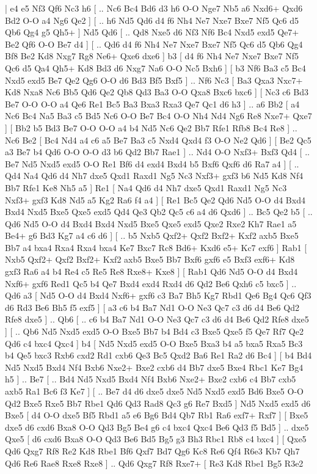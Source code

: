 \makegametitle 
|   e4   e5    Nf3   Qf6    Nc3   h6 [ .. Nc6  Bc4 Bd6  d3 h6  O-O Nge7  Nb5 a6  Nxd6+ Qxd6  Bd2 O-O  a4 Ng6  Qe2   ]  [ .. h6  Nd5 Qd6  d4 f6  Nh4 Ne7  Nxe7 Bxe7  Nf5 Qc6  d5 Qb6  Qg4 g5  Qh5+   ]  Nd5   Qd6 [ .. Qd8  Nxe5 d6  Nf3 Nf6  Bc4 Nxd5  exd5 Qe7+  Be2 Qf6  O-O Be7  d4   ]  [ .. Qd6  d4 f6  Nh4 Ne7  Nxe7 Bxe7  Nf5 Qc6  d5 Qb6  Qg4 Bf8  Be2 Kd8  Nxg7 Rg8  Ne6+ Qxe6  dxe6   ]  b3 [  d4 f6  Nh4 Ne7  Nxe7 Bxe7  Nf5 Qc6  d5 Qa4  Qh5+ Kd8  Bd3 d6  Nxg7 Na6  O-O Nc5  Bxh6   ]  [  b3 Nf6  Ba3 c5  Bc4 Nxd5  exd5 Be7  Qe2 Qg6  O-O d6  Bd3 Bf5  Bxf5   ] .. Nf6    Nc3 [  Ba3 Qxa3  Nxc7+ Kd8  Nxa8 Nc6  Bb5 Qd6  Qe2 Qb8  Qd3 Ba3  O-O Qxa8  Bxc6 bxc6   ]  [  Nc3 c6  Bd3 Be7  O-O O-O  a4 Qe6  Re1 Bc5  Ba3 Bxa3  Rxa3 Qe7  Qc1 d6  h3   ] .. a6    Bb2 [  a4 Nc6  Bc4 Na5  Ba3 c5  Bd5 Nc6  O-O Be7  Bc4 O-O  Nh4 Nd4  Ng6 Re8  Nxe7+ Qxe7   ]  [  Bb2 b5  Bd3 Be7  O-O O-O  a4 b4  Nd5 Nc6  Qe2 Bb7  Rfe1 Rfb8  Bc4 Re8   ] .. Nc6    Be2 [  Bc4 Nd4  a4 c6  a5 Be7  Ba3 c5  Nxd4 Qxd4  f3 O-O  Ne2 Qd6   ]  [  Be2 Qc5  a3 Be7  b4 Qd6  O-O O-O  d3 b6  Qd2 Bb7  Rae1   ] .. Nd4    O-O   Nxf3+    Bxf3   Qd4 [ .. Be7  Nd5 Nxd5  exd5 O-O  Re1 Bf6  d4 exd4  Bxd4 b5  Bxf6 Qxf6  d6 Ra7  a4   ]  [ .. Qd4  Na4 Qd6  d4 Nh7  dxe5 Qxd1  Raxd1 Ng5  Nc3 Nxf3+  gxf3 b6  Nd5 Kd8  Nf4 Bb7  Rfe1 Ke8  Nh5 a5   ]  Re1 [  Na4 Qd6  d4 Nh7  dxe5 Qxd1  Raxd1 Ng5  Nc3 Nxf3+  gxf3 Kd8  Nd5 a5  Kg2 Ra6  f4 a4   ]  [  Re1 Bc5  Qe2 Qd6  Nd5 O-O  d4 Bxd4  Bxd4 Nxd5  Bxe5 Qxe5  exd5 Qd4  Qe3 Qb2  Qc5 c6  a4 d6  Qxd6   ] .. Bc5    Qe2   b5 [ .. Qd6  Nd5 O-O  d4 Bxd4  Bxd4 Nxd5  Bxe5 Qxe5  exd5 Qxe2  Rxe2 Kh7  Rae1 a5  Be4+ g6  Bd3 Kg7  a4 c6  d6   ]  [ .. b5  Nxb5 Qxf2+  Qxf2 Bxf2+  Kxf2 axb5  Bxe5 Bb7  a4 bxa4  Rxa4 Rxa4  bxa4 Ke7  Bxc7 Rc8  Bd6+ Kxd6  e5+ Kc7  exf6   ]  Rab1 [  Nxb5 Qxf2+  Qxf2 Bxf2+  Kxf2 axb5  Bxe5 Bb7  Bxf6 gxf6  e5 Bxf3  exf6+ Kd8  gxf3 Ra6  a4 b4  Re4 c5  Re5 Re8  Rxe8+ Kxe8   ]  [  Rab1 Qd6  Nd5 O-O  d4 Bxd4  Nxf6+ gxf6  Red1 Qc5  b4 Qe7  Bxd4 exd4  Rxd4 d6  Qd2 Be6  Qxh6 c5  bxc5   ] .. Qd6    a3 [  Nd5 O-O  d4 Bxd4  Nxf6+ gxf6  c3 Ba7  Bh5 Kg7  Rbd1 Qe6  Bg4 Qc6  Qf3 d6  Rd3 Be6  Bh5 f5  exf5   ]  [  a3 c6  b4 Ba7  Nd1 O-O  Ne3 Qc7  c3 d6  d4 Be6  Qd2 Rfe8  dxe5   ] .. Qb6 [ .. c6  b4 Ba7  Nd1 O-O  Ne3 Qc7  c3 d6  d4 Be6  Qd2 Rfe8  dxe5   ]  [ .. Qb6  Nd5 Nxd5  exd5 O-O  Bxe5 Bb7  b4 Bd4  c3 Bxe5  Qxe5 f5  Qe7 Rf7  Qe2 Qd6  c4 bxc4  Qxc4   ]  b4 [  Nd5 Nxd5  exd5 O-O  Bxe5 Bxa3  b4 a5  bxa5 Rxa5  Bc3 b4  Qe5 bxc3  Rxb6 cxd2  Rd1 cxb6  Qe3 Bc5  Qxd2 Ba6  Re1 Ra2  d6 Bc4   ]  [  b4 Bd4  Nd5 Nxd5  Bxd4 Nf4  Bxb6 Nxe2+  Bxe2 cxb6  d4 Bb7  dxe5 Bxe4  Rbc1 Ke7  Bg4 h5   ] .. Be7 [ .. Bd4  Nd5 Nxd5  Bxd4 Nf4  Bxb6 Nxe2+  Bxe2 cxb6  c4 Bb7  cxb5 axb5  Ra1 Bc6  f3 Ke7   ]  [ .. Be7  d4 d6  dxe5 dxe5  Nd5 Nxd5  exd5 Bd6  Bxe5 O-O  Qd2 Bxe5  Rxe5 Bb7  Rbe1 Qd6  Qd3 Rad8  Qc3 g6  Re7 Bxd5   ]  Nd5   Nxd5    exd5   d6    Bxe5 [  d4 O-O  dxe5 Bf5  Rbd1 a5  e6 Bg6  Bd4 Qb7  Rb1 Ra6  exf7+ Rxf7   ]  [  Bxe5 dxe5  d6 cxd6  Bxa8 O-O  Qd3 Bg5  Be4 g6  c4 bxc4  Qxc4 Be6  Qd3 f5  Bd5   ] .. dxe5    Qxe5 [  d6 cxd6  Bxa8 O-O  Qd3 Be6  Bd5 Bg5  g3 Bh3  Rbc1 Rb8  c4 bxc4   ]  [  Qxe5 Qd6  Qxg7 Rf8  Re2 Kd8  Rbe1 Bf6  Qxf7 Bd7  Qg6 Kc8  Re6 Qf4  R6e3 Kb7  Qh7 Qd6  Re6 Rae8  Rxe8 Rxe8   ] .. Qd6    Qxg7   Rf8    Rxe7+ [  Re3 Kd8  Rbe1 Bg5  R3e2 